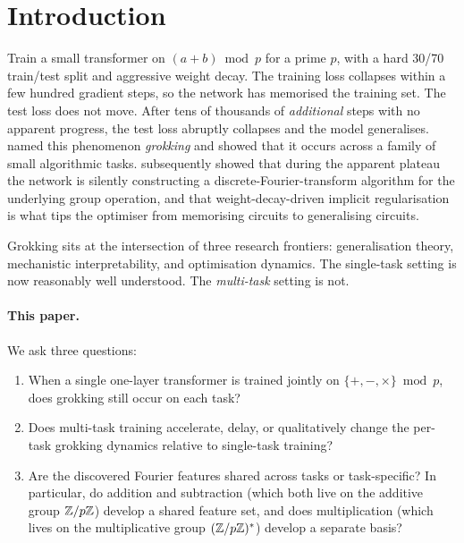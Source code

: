 \section{Introduction}
\label{sec:intro}

Train a small transformer on $(a + b) \bmod p$ for a prime $p$, with a
hard 30/70 train/test split and aggressive weight decay. The training loss
collapses within a few hundred gradient steps, so the network has memorised
the training set. The test loss does not move. After tens of thousands of
\emph{additional} steps with no apparent progress, the test loss abruptly
collapses and the model generalises. \citet{power2022grokking} named this
phenomenon \emph{grokking} and showed that it occurs across a family of
small algorithmic tasks. \citet{nanda2023progress} subsequently showed
that during the apparent plateau the network is silently constructing a
discrete-Fourier-transform algorithm for the underlying group operation,
and that weight-decay-driven implicit regularisation is what tips the
optimiser from memorising circuits to generalising circuits.

Grokking sits at the intersection of three research frontiers:
generalisation theory, mechanistic interpretability, and optimisation
dynamics. The single-task setting is now reasonably well understood. The
\emph{multi-task} setting is not.

\paragraph{This paper.} We ask three questions:
\begin{enumerate}
\item When a single one-layer transformer is trained jointly on
      $\{+, -, \times\} \bmod p$, does grokking still occur on each task?
\item Does multi-task training accelerate, delay, or qualitatively change
      the per-task grokking dynamics relative to single-task training?
\item Are the discovered Fourier features shared across tasks or
      task-specific? In particular, do addition and subtraction (which
      both live on the additive group $\mathbb{Z}/p\mathbb{Z}$) develop a shared feature
      set, and does multiplication (which lives on the multiplicative
      group $(\mathbb{Z}/p\mathbb{Z})^*$) develop a separate basis?
\end{enumerate}

